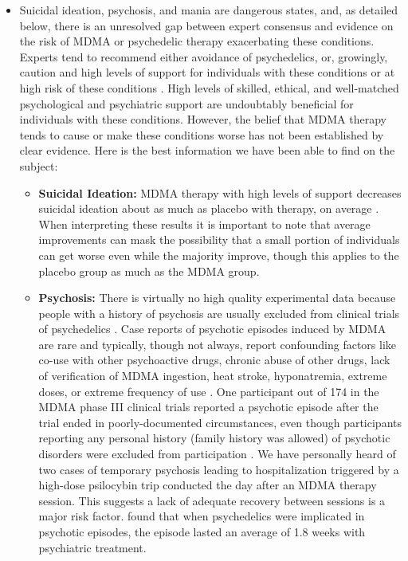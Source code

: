 \documentclass[12pt,letterpaper]{book}
\begin{document}
\begin{itemize}
    \item Suicidal ideation, psychosis, and mania are dangerous states, and, as detailed below, there is an unresolved gap between expert consensus and evidence on the risk of MDMA or psychedelic therapy exacerbating these conditions. Experts tend to recommend either avoidance of psychedelics, or, growingly, caution and high levels of support for individuals with these conditions or at high risk of these conditions \cite{la2022Psychosis}. High levels of skilled, ethical, and well-matched psychological and psychiatric support are undoubtably beneficial for individuals with these conditions. However, the belief that MDMA therapy tends to cause or make these conditions worse has not been established by clear evidence. Here is the best information we have been able to find on the subject:
        \begin{itemize}
            \item \textbf{Suicidal Ideation:} MDMA therapy with high levels of support decreases suicidal ideation about as much as placebo with therapy, on average \cite{mitchellMDMAClinicalTrial,mitchellMDMAClinicalTrial2}. When interpreting these results it is important to note that average improvements can mask the possibility that a small portion of individuals can get worse even while the majority improve, though this applies to the placebo group as much as the MDMA group.
            \item \textbf{Psychosis:} There is virtually no high quality experimental data because people with a history of psychosis are usually excluded from clinical trials of psychedelics \cite{la2022Psychosis}. Case reports of psychotic episodes induced by MDMA are rare and typically, though not always, report confounding factors like co-use with other psychoactive drugs, chronic abuse of other drugs, lack of verification of MDMA ingestion, heat stroke, hyponatremia, extreme doses, or extreme frequency of use \cite{psychosisTreatment,arnovitzSchizophrenia,mcguirePsychosis,patelPsychosis,vaivaPsychosis}. One participant out of 174 in the MDMA phase III clinical trials reported a psychotic episode after the trial ended in poorly-documented circumstances, even though participants reporting any personal history (family history was allowed) of psychotic disorders were excluded from participation \cite{powerTrip,smithSystematic,mitchellMDMAClinicalTrial2}. We have personally heard of two cases of temporary psychosis leading to hospitalization triggered by a high-dose psilocybin trip conducted the day after an MDMA therapy session. This suggests a lack of adequate recovery between sessions is a major risk factor. \textcite{psychosisTreatment} found that when psychedelics were implicated in psychotic episodes, the episode lasted an average of 1.8 weeks with psychiatric treatment.

\end{itemize}
\end{itemize}
\end{document}
